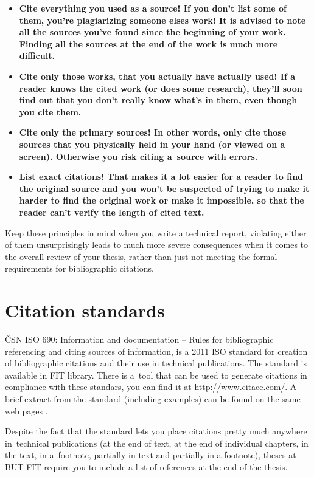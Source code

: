 {{\begin{itemize}
  \item{\bf Cite everything you used as a source! \rm If you don't list some of them, you're plagiarizing someone elses work! It is advised to note all the sources you've found since the beginning of your work. Finding all the sources at the end of the work is much more difficult.}
  \item{\bf Cite only those works, that you actually have actually used! \rm If a reader knows the cited work (or does some research), they'll soon find out that you don't really know what's in them, even though you cite them.}
  \item{\bf Cite only the primary sources! \rm In other words, only cite those sources that you physically held in your hand (or viewed on a screen). Otherwise you risk citing a~source with errors.}
  \item{\bf List exact citations! \rm That makes it a lot easier for a reader to find the original source and you won't be suspected of trying to make it harder to find the original work or make it impossible, so that the reader can't verify the length of cited text.}
\end{itemize}

Keep these principles in mind when you write a technical report, violating either of them unsurprisingly leads to much more severe consequences when it comes to the overall review of your thesis, rather than just not meeting the formal requirements for bibliographic citations.

\section{Citation standards}

ČSN ISO 690: Information and documentation -- Rules for bibliographic referencing and citing sources of information, is a 2011 ISO standard for creation of bibliographic citations and their use in technical publications. The standard is available in FIT library. There is a~tool that can be used to generate citations in compliance with these standars, you can find it at \url{http://www.citace.com/}. A brief extract from the standard (including examples) can be found on the same web pages \cite{biblio}.

Despite the fact that the standard lets you place citations pretty much anywhere in~technical publications (at the end of text, at the end of individual chapters, in the text, in a~footnote, partially in text and partially in a footnote), theses at BUT FIT require you to include a list of references at the end of the thesis.

}}
